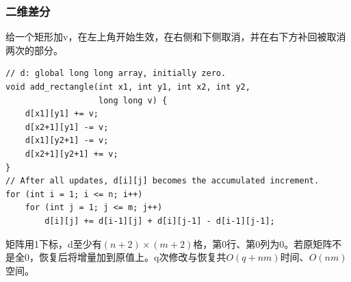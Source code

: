 \subsubsection{二维差分}
给一个矩形加v，在左上角开始生效，在右侧和下侧取消，并在右下方补回被取消两次的部分。
\begin{lstlisting}
// d: global long long array, initially zero.
void add_rectangle(int x1, int y1, int x2, int y2,
                   long long v) {
    d[x1][y1] += v;
    d[x2+1][y1] -= v;
    d[x1][y2+1] -= v;
    d[x2+1][y2+1] += v;
}
// After all updates, d[i][j] becomes the accumulated increment.
for (int i = 1; i <= n; i++)
    for (int j = 1; j <= m; j++)
        d[i][j] += d[i-1][j] + d[i][j-1] - d[i-1][j-1];
\end{lstlisting}
矩阵用1下标，d至少有$(n+2)\times(m+2)$格，第0行、第0列为0。若原矩阵不是全0，恢复后将增量加到原值上。q次修改与恢复共$O(q+nm)$时间、$O(nm)$空间。
